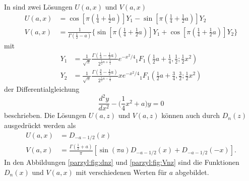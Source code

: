 In \cite{parzyl:abramowitz-stegun} sind zwei Lösungen $U(a, x)$ und $V(a,x)$ 
\begin{align}
    U(a,x) &= 
    \cos[\pi ({\textstyle \frac{1}{4}} + {\textstyle \frac{1}{2}} a)] Y_1
    - \sin[\pi ({\textstyle \frac{1}{4}} + {\textstyle \frac{1}{2}} a)] Y_2 
    \label{parzyl:eq:Uaz}
    \\
    V(a,x) &= \frac{1}{\Gamma ({\textstyle \frac{1}{2} - a})} \{
    \sin[\pi ({\textstyle \frac{1}{4}} + {\textstyle \frac{1}{2}} a)] Y_1
    + \cos[\pi ({\textstyle \frac{1}{4}} + {\textstyle \frac{1}{2}} a)] Y_2
    \}
    \label{parzyl:eq:Vaz}
\end{align}
mit
\begin{align}
    Y_1 &= \frac{1}{\sqrt{\pi}} 
            \frac{\Gamma({\textstyle \frac{1}{4} - 
            {\textstyle \frac{1}{2}}a})}
            {2^{\frac{1}{2} a + \frac{1}{4}}}
            e^{-x^2/4} 
            {}_{1} F_{1}
                ({\textstyle \frac{1}{2}}a + {\textstyle \frac{1}{4}}, 
                {\textstyle \frac{1}{2}} ; 
                {\textstyle \frac{1}{2}}x^2)\\
        Y_2 &= \frac{1}{\sqrt{\pi}} 
            \frac{\Gamma({\textstyle \frac{3}{4} - 
            {\textstyle \frac{1}{2}}a})}
            {2^{\frac{1}{2} a - \frac{1}{4}}} 
            x e^{-x^2/4} 
            {}_{1} F_{1}
                ({\textstyle \frac{1}{2}}a + {\textstyle \frac{3}{4}}, 
                {\textstyle \frac{3}{2}} ; 
                {\textstyle \frac{1}{2}}x^2)
\end{align}
der Differentialgleichung
\begin{equation}
    \frac{d^2 y}{d x^2} - \biggl(\frac{1}{4} x^2 + a\biggr) y = 0
\end{equation}
beschrieben.
Die Lösungen $U(a,z)$ und $V(a, z)$ können auch durch $D_n(z)$
ausgedrückt werden als
\begin{align}
    U(a,x) &= D_{-a-1/2}(x) \\
    V(a,x) &= \frac{\Gamma ({\textstyle \frac{1}{2}} + a)}{\pi}
    [\sin(\pi a) D_{-a-1/2}(x) + D_{-a-1/2}(-x)].
\end{align}
In den Abbildungen \ref{parzyl:fig:dnz} und \ref{parzyl:fig:Vnz} sind 
die Funktionen $D_n(x)$ und $V(a,x)$ mit verschiedenen Werten für $a$
abgebildet.
